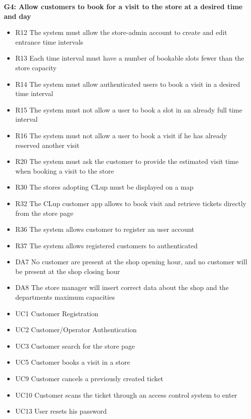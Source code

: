 \textbf{G4: Allow customers to book for a visit to the store at a desired time and day}
\begin{itemize}[label=\textcolor{clup_blue2}{\textbullet}]
    \item R12 The system must allow the store-admin account to create and edit entrance time intervals
    \item R13 Each time interval must have a number of bookable slots fewer than the store capacity
    \item R14 The system must allow authenticated users to book a visit in a desired time interval
    \item R15 The system must not allow a user to book a slot in an already full time interval
    \item R16 The system must not allow a user to book a visit if he has already reserved another visit
    \item R20 The system  must ask the customer to provide the estimated visit time when booking a visit to the store
    \item R30 The stores adopting CLup must be displayed on a map
    \item R32 The CLup customer app allows to book visit and retrieve tickets directly from the store page
    \item R36 The system allows customer to register an user account
    \item R37 The system allows registered customers to authenticated
\end{itemize}
\begin{itemize}[label=\textcolor{clup_red}{\textbullet}]
    \item DA7 No customer are present at the shop opening hour, and no customer will be present at the shop closing hour
    \item DA8 The store manager will insert correct data about the shop and the departments maximum capacities
\end{itemize}
\begin{itemize}[label=\textcolor{clup_yellow}{\textbullet}]
    \item UC1 Customer Registration
    \item UC2 Customer/Operator Authentication
    \item UC3 Customer search for the store page
    \item UC5 Customer books a visit in a store
    \item UC9 Customer cancels a previously created ticket
    \item UC10 Customer scans the ticket through an access control system to enter
    \item UC13 User resets his password
\end{itemize}

